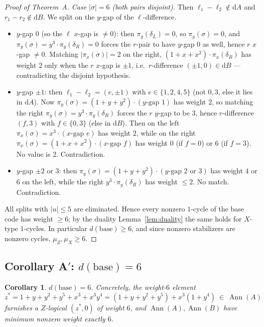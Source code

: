 \documentclass[11pt]{article}
\newcommand{\wt}[1]{\lvert #1\rvert}
\DeclareMathOperator{\Ann}{Ann}
\theoremstyle{plain}
\newtheorem{corollary}[lemma]{Corollary}
\theoremstyle{definition}
\theoremstyle{remark}
\begin{document}
\begin{proof}[Proof of Theorem~A]
\emph{Case $\wt{\sigma}=6$ (both pairs disjoint).} Then $\ell_1-\ell_2\notin\mathrm dA$ and
$r_1-r_2\notin\mathrm dB$. We split on the $y$-gap of the $\ell$-difference.
\begin{itemize}
\item $y$-gap $0$ (so the $\ell$ $x$-gap is $\ne0$): then $\pi_y(\delta_L)=0$, so
  $\pi_y(\sigma)=0$, and $\pi_y(\sigma)=y^3\cdot\pi_y(\delta_R)=0$ forces the $r$-pair to
  have $y$-gap $0$ as well, hence $r$ $x$-gap $\ne0$. Matching
  $\wt{\pi_x(\sigma)}=2$ on the right, $(1+x+x^2)\cdot\pi_x(\delta_R)$ has weight $2$ only when
  the $r$ $x$-gap is $\pm1$, i.e.\ $r$-difference $(\pm1,0)\in\mathrm dB$ --- contradicting
  the disjoint hypothesis.
\item $y$-gap $\pm1$: then $\ell_1-\ell_2=(e,\pm1)$ with $e\in\{1,2,4,5\}$ (not $0,3$, else
  it lies in $\mathrm dA$). Now $\pi_y(\sigma)=(1+y+y^2)\cdot(\text{$y$-gap }1)$ has weight
  $2$, so matching the right $\pi_y(\sigma)=y^3\cdot\pi_y(\delta_R)$ forces the $r$ $y$-gap to
  be $3$, hence $r$-difference $(f,3)$ with $f\in\{0,3\}$ (else in $\mathrm dB$). Then on the
  left $\pi_x(\sigma)=x^3\cdot(\text{$x$-gap }e)$ has weight $2$, while on the right
  $\pi_x(\sigma)=(1+x+x^2)\cdot(\text{$x$-gap }f)$ has weight $0$ (if $f=0$) or $6$ (if
  $f=3$). No value is $2$. Contradiction.
\item $y$-gap $\pm2$ or $3$: then $\pi_y(\sigma)=(1+y+y^2)\cdot(\text{$y$-gap }2\text{ or }3)$
  has weight $4$ or $6$ on the left, while the right $y^3\cdot\pi_y(\delta_R)$ has weight
  $\le2$. No match. Contradiction.
\end{itemize}

All splits with $\wt{u}\le5$ are eliminated. Hence every nonzero $1$-cycle of the base code
has weight $\ge6$; by the duality Lemma~\ref{lem:duality} the same holds for $X$-type
$1$-cycles. In particular $d(\mathrm{base})\ge6$, and since nonzero stabilizers are nonzero
cycles, $\mu_Z,\mu_X\ge6$.
\end{proof}

\subsection*{Corollary A$'$: $d(\mathrm{base})=6$}

\begin{corollary}\label{cor:Aprime}
$d(\mathrm{base})=6$. Concretely, the weight-$6$ element
\[
  z^\ast=1+y+y^2+y^5+x^3+x^3y^4=(1+y+y^2+y^5)+x^3(1+y^4)\ \in\ \Ann(A)
\]
furnishes a $Z$-logical $(z^\ast,0)$ of weight $6$, and $\Ann(A),\Ann(B)$ have minimum
nonzero weight exactly $6$.
\end{corollary}
\end{document}
